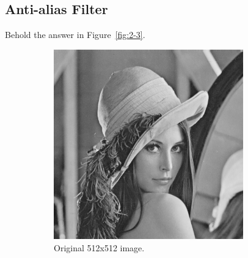 \subsection{Anti-alias Filter}

Behold the answer in Figure~\ref{fig:2-3}.

\newcommand{\sftt}[1]{
    \begin{subfigure}[b]{0.3\textwidth}
        \texttt{[image: ../code/2\_out/2-3\_g\#1.png]}
        \caption{$\sigma = $#1}
        \label{fig:2-3:#1}
    \end{subfigure}
}

\begin{figure}[h]
\centering

    \begin{subfigure}[b]{0.3\textwidth}
        \includegraphics[width=0.9\textwidth]{../code/img/lena.png}
        \caption{Original 512x512 image.}
        \label{fig:2-3:1}
    \end{subfigure}
    \begin{subfigure}[b]{0.3\textwidth}

\end{subfigure}
\end{figure}
